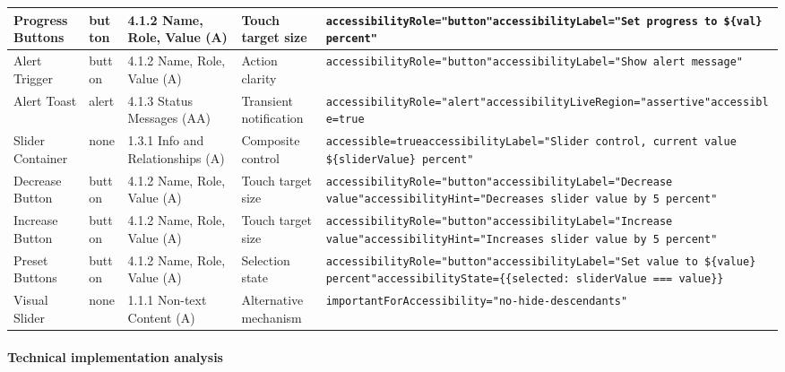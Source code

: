 \begin{longtable}{|p{2.5cm}|p{2cm}|p{2.8cm}|p{2.8cm}|p{4.3cm}|}
\hline
Progress Buttons & button & 4.1.2 Name, Role, Value (A) & Touch target size & \texttt{accessibilityRole="button"}\newline \texttt{accessibilityLabel="Set progress to \$\{val\} percent"} \\
\hline
Alert Trigger & button & 4.1.2 Name, Role, Value (A) & Action clarity & \texttt{accessibilityRole="button"}\newline \texttt{accessibilityLabel="Show alert message"} \\
\hline
Alert Toast & alert & 4.1.3 Status Messages (AA) & Transient notification & \texttt{accessibilityRole="alert"}\newline \texttt{accessibilityLiveRegion="assertive"}\newline \texttt{accessible=true} \\
\hline
Slider Container & none & 1.3.1 Info and Relationships (A) & Composite control & \texttt{accessible=true}\newline \texttt{accessibilityLabel="Slider control, current value \$\{sliderValue\} percent"} \\
\hline
Decrease Button & button & 4.1.2 Name, Role, Value (A) & Touch target size & \texttt{accessibilityRole="button"}\newline \texttt{accessibilityLabel="Decrease value"}\newline \texttt{accessibilityHint="Decreases slider value by 5 percent"} \\
\hline
Increase Button & button & 4.1.2 Name, Role, Value (A) & Touch target size & \texttt{accessibilityRole="button"}\newline \texttt{accessibilityLabel="Increase value"}\newline \texttt{accessibilityHint="Increases slider value by 5 percent"} \\
\hline
Preset Buttons & button & 4.1.2 Name, Role, Value (A) & Selection state & \texttt{accessibilityRole="button"}\newline \texttt{accessibilityLabel="Set value to \$\{value\} percent"}\newline \texttt{accessibilityState=\{\{selected: sliderValue === value\}\}} \\
\hline
Visual Slider & none & 1.1.1 Non-text Content (A) & Alternative mechanism & \texttt{importantForAccessibility="no-hide-descendants"} \\
\end{longtable}

\paragraph{Technical implementation analysis}

